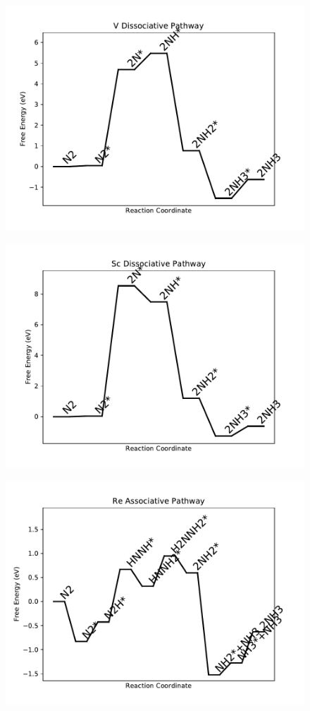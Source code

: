 \begin{figure}
\includegraphics[width=0.8\linewidth]{data/plots/V_dissociative.pdf}
\label{fig:V_dissociative}
\end{figure}

\begin{figure}
\includegraphics[width=0.8\linewidth]{data/plots/Sc_dissociative.pdf}
\label{fig:Sc_dissociative}
\end{figure}

\begin{figure}
\includegraphics[width=0.8\linewidth]{data/plots/Re_associative.pdf}
\label{fig:Re_associative}
\end{figure}

